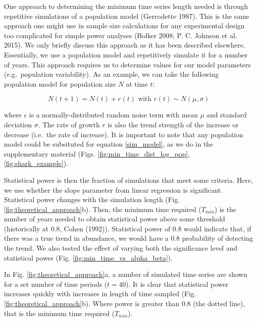 \documentclass[12pt,]{article}
\begin{document}
One approach to determining the minimum time series length needed is
through repetitive simulations of a population model (Gerrodette 1987).
This is the same approach one might use in sample size calculations for
any experimental design too complicated for simple power analyses
(Bolker 2008; P. C. Johnson et al. 2015). We only briefly discuss this
approach as it has been described elsewhere. Essentially, we use a
population model and repetitively simulate it for a number of years.
This approach requires us to determine values for our model parameters
(e.g.~population variability). As an example, we can take the following
population model for population size \(N\) at time \(t\):

\begin{equation}
N(t + 1) = N(t) + r(t) \mbox{ with } r(t) \sim N(\mu, \sigma)
\label{sim_model}
\end{equation}

where \(\epsilon\) is a normally-distributed random noise term with mean
\(\mu\) and standard deviation \(\sigma\). The rate of growth \(r\) is
also the trend strength of the increase or decrease (i.e.~the rate of
increase). It is important to note that any population model could be
subsituted for equation \ref{sim_model}, as we do in the supplementary
material (Figs. \ref{fig:min_time_dist_log_pop},
\ref{fig:shark_example}).

Statistical power is then the fraction of simulations that meet some
criteria. Here, we use whether the slope parameter from linear
regression is significant. Statistical power changes with the simulation
length (Fig. \ref{fig:theoretical_approach}b). Then, the minimum time
required (\(T_{min}\)) is the number of years needed to obtain
statistical power above some threshold (historically at 0.8, Cohen
(1992)). Statistical power of 0.8 would indicate that, if there was a
true trend in abundance, we would have a 0.8 probability of detecting
the trend. We also tested the effect of varying both the significance
level and statistical power (Fig. \ref{fig:min_time_vs_alpha_beta}).

In Fig. \ref{fig:theoretical_approach}a, a number of simulated time
series are shown for a set number of time periods (\(t=40\)). It is
clear that statistical power increases quickly with increases in length
of time sampled (Fig. \ref{fig:theoretical_approach}b). Where power is
greater than 0.8 (the dotted line), that is the minimum time required
(\(T_{min}\)).
\end{document}
